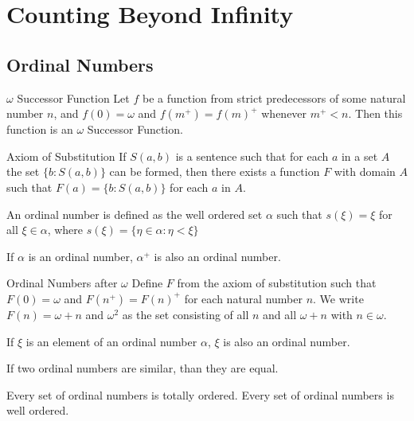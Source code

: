 \documentclass[a4paper]{article}
\begin{document}
\section{Counting Beyond Infinity}
\subsection{Ordinal Numbers}
\begin{defn}{$\omega$ Successor Function}{} Let $f$ be a function from strict predecessors of some natural number $n$, and $f(0)=\omega$ and $f(m^+)=f(m)^+$ whenever $m^+<n$. Then this function is an $\omega$ Successor Function. 
\end{defn}

\begin{axm}{Axiom of Substitution}{} If $S(a,b)$ is a sentence such that for each $a$ in a set $A$ the set $\{b:S(a,b)\}$ can be formed, then there exists a function $F$ with domain $A$ such that $F(a)=\{b:S(a,b)\}$ for each $a$ in $A$. 
\end{axm}

\begin{defn}{}{} An ordinal number is defined as the well ordered set $\alpha$ such that $s(\xi)=\xi$ for all $\xi\in\alpha$, where $s(\xi)=\{\eta\in\alpha:\eta<\xi\}$
\end{defn}

\begin{thm}{}{} If $\alpha$ is an ordinal number, $\alpha^+$ is also an ordinal number. 
\end{thm}

\begin{defn}{Ordinal Numbers after $\omega$}{} Define $F$ from the axiom of substitution such that $F(0)=\omega$ and $F(n^+)=F(n)^+$ for each natural number $n$. We write $F(n)=\omega+n$ and $\omega^2$ as the set consisting of all $n$ and all $\omega+n$ with $n\in\omega$. 
\end{defn}

\begin{thm}{}{} If $\xi$ is an element of an ordinal number $\alpha$, $\xi$ is also an ordinal number. 
\end{thm}

\begin{thm}{}{} If two ordinal numbers are similar, than they are equal. 
\end{thm}

\begin{thm}{}{} Every set of ordinal numbers is totally ordered. Every set of ordinal numbers is well ordered. 
\end{thm}
\end{document}
